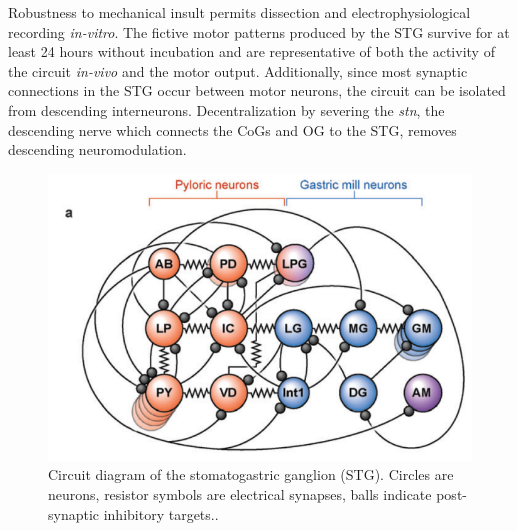 Robustness to mechanical insult permits dissection and electrophysiological recording \textit{in-vitro}. The fictive motor patterns produced by the \acs{STG} survive for at least 24 hours without incubation and are representative of both the activity of the circuit \textit{in-vivo} and the motor output\autocite{HamoodConsequencesacutelongterm2015}. Additionally, since most synaptic connections in the \acs{STG} occur between motor neurons, the circuit can be isolated from descending interneurons\autocite{HamoodQuantitativeReevaluationEffects2015,GoldmanGlobalStructureRobustness2001,HaddadCircuitrobustnesstemperature2017}.  Decentralization by severing the \textit{stn}, the descending nerve which connects the \acsp{CoG} and \acs{OG} to the \acs{STG}, removes descending neuromodulation.

\begin{figure}[h]
	\centering
	\includegraphics[width=1\linewidth]{gfx/NusbaumMarder2017.png}
	\caption[Circuit diagram of the STG]{Circuit diagram of the stomatogastric ganglion (\acs{STG}). Circles are neurons, resistor symbols are electrical synapses, balls indicate post-synaptic inhibitory targets.\autocite{NusbaumMichaelP.Functionalconsequencesneuropeptide2017}.}
	\label{fig:circuitdiagram}
\end{figure}

\FloatBarrier


